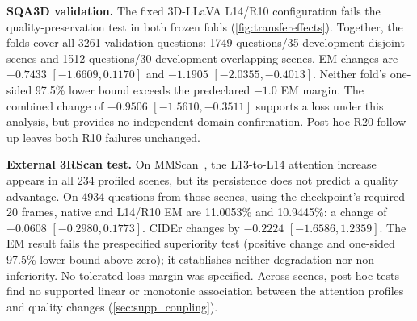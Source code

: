 \textbf{SQA3D validation.} The fixed 3D-LLaVA L14/R10 configuration fails the quality-preservation test in both frozen folds (\cref{fig:transfereffects}). Together, the folds cover all 3261 validation questions: 1749 questions/35 development-disjoint scenes and 1512 questions/30 development-overlapping scenes. EM changes are $-0.7433$ $[-1.6609,0.1170]$ and $-1.1905$ $[-2.0355,-0.4013]$. Neither fold's one-sided 97.5\% lower bound exceeds the predeclared $-1.0$ EM margin. The combined change of $-0.9506$ $[-1.5610,-0.3511]$ supports a loss under this analysis, but provides no independent-domain confirmation. Post-hoc R20 follow-up leaves both R10 failures unchanged.

\textbf{External 3RScan test.} On MMScan~\citep{lyu2024mmscan}, the L13-to-L14 attention increase appears in all 234 profiled scenes, but its persistence does not predict a quality advantage. On 4934 questions from those scenes, using the checkpoint's required 20 frames, native and L14/R10 EM are 11.0053\% and 10.9445\%: a change of $-0.0608$ $[-0.2980,0.1773]$. CIDEr changes by $-0.2224$ $[-1.6586,1.2359]$. The EM result fails the prespecified superiority test (positive change and one-sided 97.5\% lower bound above zero); it establishes neither degradation nor non-inferiority. No tolerated-loss margin was specified. Across scenes, post-hoc tests find no supported linear or monotonic association between the attention profiles and quality changes (\cref{sec:supp_coupling}).

